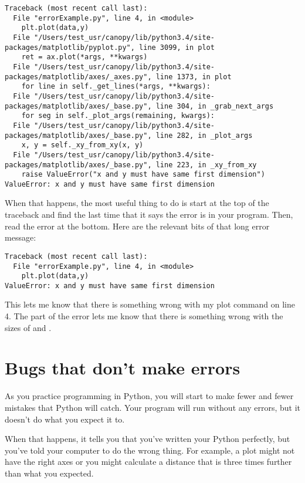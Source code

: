 \begin{Verbatim}
Traceback (most recent call last):
  File "errorExample.py", line 4, in <module>
    plt.plot(data,y)
  File "/Users/test_usr/canopy/lib/python3.4/site-packages/matplotlib/pyplot.py", line 3099, in plot
    ret = ax.plot(*args, **kwargs)
  File "/Users/test_usr/canopy/lib/python3.4/site-packages/matplotlib/axes/_axes.py", line 1373, in plot
    for line in self._get_lines(*args, **kwargs):
  File "/Users/test_usr/canopy/lib/python3.4/site-packages/matplotlib/axes/_base.py", line 304, in _grab_next_args
    for seg in self._plot_args(remaining, kwargs):
  File "/Users/test_usr/canopy/lib/python3.4/site-packages/matplotlib/axes/_base.py", line 282, in _plot_args
    x, y = self._xy_from_xy(x, y)
  File "/Users/test_usr/canopy/lib/python3.4/site-packages/matplotlib/axes/_base.py", line 223, in _xy_from_xy
    raise ValueError("x and y must have same first dimension")
ValueError: x and y must have same first dimension
\end{Verbatim}

When that happens, the most useful thing to do is start at the top of the traceback and find the last time that it says the error is in your program.  Then, read the error at the bottom.  Here are the relevant bits of that long error message:

\begin{Verbatim}
Traceback (most recent call last):
  File "errorExample.py", line 4, in <module>
    plt.plot(data,y)
ValueError: x and y must have same first dimension
\end{Verbatim}
This lets me know that there is something wrong with my plot command on line 4. The  part of the error lets me know that there is something wrong with the sizes of  and .

\section{Bugs that don't make errors}
As you practice programming in Python, you will start to make fewer and fewer mistakes that Python will catch.  Your program will run without any errors, but it doesn't do what you expect it to.

When that happens, it tells you that you've written your Python perfectly, but you've told your computer to do the wrong thing.  For example, a plot might not have the right axes or
you might calculate a distance that is three times further than what you expected.

